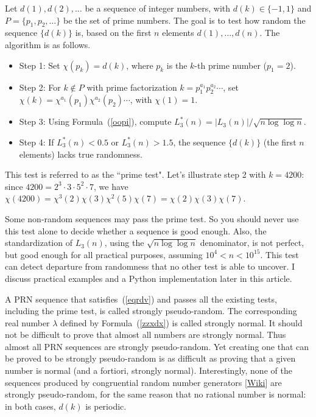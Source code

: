 \documentclass[oneside,10pt]{book}
\begin{document}
Let $d(1),d(2),\dots$ be a sequence of integer numbers, with $d(k)\in \{-1,1\}$ and
$P=\{p_1,p_2,\dots\}$ be the set of prime numbers. The goal is to test how random the sequence $\{d(k)\}$ is, based on the first $n$ elements $d(1),\dots,d(n)$. The algorithm is as follows.
\begin{itemize}
\item Step 1: Set $\chi(p_k)=d(k)$, where $p_k$ is the $k$-th prime number ($p_1=2$). 
\item Step 2: For $k\notin P$ with
 prime factorization $k=p_1^{a_1}p_2^{a_2}\cdots$, set
$\chi(k)=\chi^{a_1}(p_1)\chi^{a_2}(p_2)\cdots$, with $\chi(1)=1.$
\item Step 3: Using Formula~(\ref{oopi}), compute $L^*_3(n) = |L_3(n)|/\sqrt{n\log\log n}$. 
\item Step 4: If $L^*_3(n)<0.5$ or $L^*_3(n)>1.5$, the sequence $\{d(k)\}$ (the first $n$ elements) lacks true randomness.
\end{itemize}
This test is referred to as the ``\textcolor{index}{prime test}".
Let's illustrate step 2 with $k=4200$: since $4200=2^3\cdot 3\cdot 5^2 \cdot 7$, we have $\chi(4200)=\chi^3(2)\chi(3)\chi^2(5)\chi(7)
 = \chi(2)\chi(3)\chi(7)$. 

Some non-random sequences may pass the prime test. So you should never use this test alone to decide whether a sequence is good enough.
 Also, the standardization of $L_3(n)$, using the $\sqrt{n\log\log n}$ denominator, is not perfect, but good enough for all practical purposes, assuming $10^4<n<10^{15}$.  This test can detect departure from randomness that no other test is able to uncover. 
I discuss practical examples and
 a Python implementation later in this article.

A PRN sequence that satisfies~(\ref{eqrdv}) and passes all the existing tests, including the prime test, is called \textcolor{index}{strongly pseudo-random}. The
corresponding real number $\lambda$ defined by Formula~(\ref{zzxdx}) is called \textcolor{index}{strongly normal}. It should not be difficult to
prove that almost all numbers are strongly normal. Thus almost all PRN sequences are strongly pseudo-random. Yet creating
one that can be proved to be strongly pseudo-random is as difficult as proving that a given number is normal (and a fortiori, strongly normal). Interestingly, none of the sequences produced by \textcolor{index}{congruential random number generators} 
[\href{https://en.wikipedia.org/wiki/Linear_congruential_generator}{Wiki}] are strongly pseudo-random,
for the same reason that no rational number is normal: in both cases, $d(k)$ is periodic. 
\end{document}
